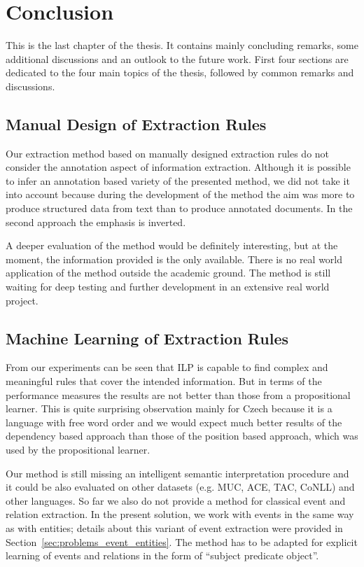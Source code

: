 \chapter{Conclusion} \label{sec:ch_conclusion}

This is the last chapter of the thesis. It contains mainly concluding remarks, some additional discussions and an outlook to the future work. First four sections are dedicated to the four main topics of the thesis, followed by common remarks and discussions. 



\section{Manual Design of Extraction Rules}


Our extraction method based on manually designed extraction rules do not consider the annotation aspect of information extraction. Although it is possible to infer an annotation based variety of the presented method, we did not take it into account because during the development of the method the aim was more to produce structured data from text than to produce annotated documents. In the second approach the emphasis is inverted. 

A deeper evaluation of the method would be definitely interesting, but at the moment, the information provided is the only available. There is no real world application of the method outside the academic ground. The method is still waiting for deep testing and further development in an extensive real world project.



\section{Machine Learning of Extraction Rules}

From our experiments can be seen that ILP is capable to find complex and meaningful rules that cover the intended information. But in terms of the performance measures the results are not better than those from a propositional learner. This is quite surprising observation mainly for  Czech because it is a language with free word order and we would expect much better results of the dependency based approach than those of the position based approach, which was used by the propositional learner.

Our method is still missing an intelligent semantic interpretation procedure and it could be also evaluated on other datasets (e.g. MUC, ACE, TAC, CoNLL) and other languages. So far we also do not provide a method for classical event and relation extraction. %
In the present solution, we work with events in the same way as with entities; details about this variant of event extraction were provided in Section~\ref{sec:problems_event_entities}. The method has to be adapted for explicit learning of events and relations in the form of ``subject predicate object''.

